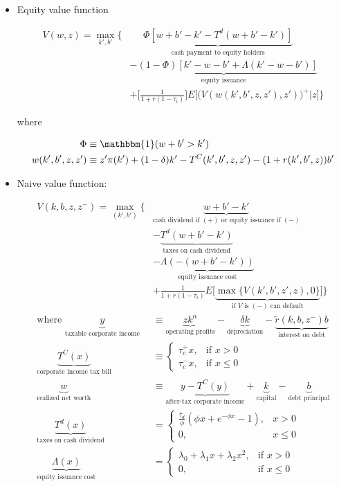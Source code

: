 \documentclass{article}
\newcommand{\one}{\mathbbm{1}}
\begin{document}
\begin{itemize}
\item Equity value function

\begin{align*}
V(w, z) 
= \max_{k', b'} \Bigg\{ &\; \; \;  \;  \; 
\underbrace{\Phi [w + b' - k' - T^d(w + b' - k')]}_{\text{cash payment to equity holders}}\\
&\underbrace{- (1-\Phi) [k' - w - b' + \Lambda(k'-w - b')]}_{\text{equity issuance}}\\
&+ \Bigg[ \frac{1}{1 + r ( 1-\tau_i)}\Bigg] E\Bigg[\Big(V(w(k', b', z, z'), z')\Big)^+\Bigg| z \Bigg]\Bigg\}
\end{align*}

where 

\begin{align*}
\Phi &\equiv \one (w + b' > k')\\
w(k', b', z, z') &\equiv z' \pi(k') + (1-\delta) k' - T^C(k', b', z, z') - (1 +r(k', b', z)) b'
\end{align*}

\pagebreak

\item Naive value function:

\begin{align*}
V(k, b, z, z^-) =
\max_{(k', b')} \Bigg\{ 
& \underbrace{w + b' - k'}_{\text{cash dividend if } (+) \text{ or equity issuance if } (-)} \\ 
&- \underbrace{T^d(w + b' - k')}_{\text{taxes on cash dividend}} \\
&- \underbrace{\Lambda(-(w + b' - k'))}_{\text{equity issuance cost}} \\
&+ \frac{1}{1+r(1-\tau_i)} E\Big[\underbrace{\max\{ V(k', b', z', z), 0\}}_{\text{if }V \text{ is } (-) \text{ can default}}\Big] \Bigg\} \\
\text{where }
\underbrace{y}_{\text{taxable corporate income}} &\equiv \underbrace{z k^\alpha}_{\text{operating profits}} - \underbrace{\delta k}_{\text{depreciation}} - \underbrace{\tilde r(k, b, z^-) b}_{\text{interest on debt}} \\
\underbrace{T^C(x)}_{\text{corporate income tax bill}} &\equiv 
\begin{cases} 
\tau_c^+ x, & \text{if }x > 0 \\
\tau_c^- x, & \text{if }x \le 0
\end{cases}\\
\underbrace{w}_{\text{realized net worth}} &\equiv \underbrace{y - T^C(y)}_{\text{after-tax corporate income}}+ \underbrace{k}_{\text{capital}}  - \underbrace{b}_{\text{debt principal}} \\
\underbrace{T^d(x)}_{\text{taxes on cash dividend}} &= 
\begin{cases}
\frac{\bar \tau_d}{\phi}(\phi x + e^{-\phi x} - 1), & x > 0 \\
0,& x \le 0
\end{cases} \\
\underbrace{\Lambda(x)}_{\text{equity issuance cost}} &= 
\begin{cases} 
\lambda_0 + \lambda_1 x + \lambda_2 x^2, & \text{if }x > 0 \\
0, & \text{if }x \le 0
\end{cases}
\end{align*}


\end{itemize}
\end{document}
